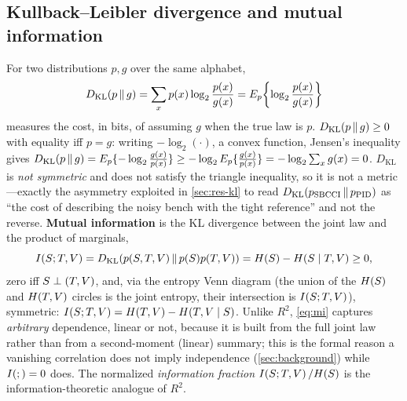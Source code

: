 \subsection{Kullback--Leibler divergence and mutual information}
\label{sec:th-mi}
For two distributions $p,g$ over the same alphabet,
\begin{equation}
  D_{\mathrm{KL}}\!\left(p \,\|\, g\right) = \sum_x p(x)\log_2\frac{p(x)}{g(x)} = E_p\!\left\{\log_2\frac{p(x)}{g(x)}\right\}
  \label{eq:kl}
\end{equation}
measures the cost, in bits, of assuming $g$ when the true law is $p$.
$D_{\mathrm{KL}}\!\left(p \,\|\, g\right)\ge0$ with equality iff $p=g$: writing $-\log_2(\cdot)$, a convex
function, Jensen's inequality gives
$D_{\mathrm{KL}}\!\left(p \,\|\, g\right)=E_p\{-\log_2\frac{g(x)}{p(x)}\}\ge-\log_2 E_p\{\frac{g(x)}{p(x)}\}=-\log_2\sum_x g(x)=0$.
$D_{\mathrm{KL}}$ is \emph{not symmetric} and does not satisfy the triangle
inequality, so it is not a metric---exactly the asymmetry exploited in
\cref{sec:res-kl} to read $D_{\mathrm{KL}}\!\left(p_{\text{SBCCI}} \,\|\, p_{\text{PID}}\right)$ as ``the cost of
describing the noisy bench with the tight reference'' and not the reverse.
\textbf{Mutual information} is the KL divergence between the joint law and the
product of marginals,
\begin{equation}
  I\!\left(S ; T,V\right) = D_{\mathrm{KL}}\!\left(p(S,T,V) \,\|\, p(S)p(T,V)\right)
  = H\!\left(S\right)-H\!\left(S\mid T,V\right) \ge 0,
  \label{eq:mi}
\end{equation}
zero iff $S\perp(T,V)$, and, via the entropy Venn diagram (the union
of the $H\!\left(S\right)$ and $H\!\left(T,V\right)$ circles is the joint entropy, their
intersection is $I\!\left(S ; T,V\right)$), symmetric:
$I\!\left(S ; T,V\right)=H\!\left(T,V\right)-H\!\left(T,V\mid S\right)$. Unlike
$R^2$, \cref{eq:mi} captures \emph{arbitrary} dependence, linear or not, because
it is built from the full joint law rather than from a second-moment (linear)
summary; this is the formal reason a vanishing correlation does not imply
independence (\cref{sec:background}) while $I\!\left( ; \right)=0$ does. The normalized
\emph{information fraction} $I\!\left(S ; T,V\right)/H\!\left(S\right)$ is the
information-theoretic analogue of $R^2$.

